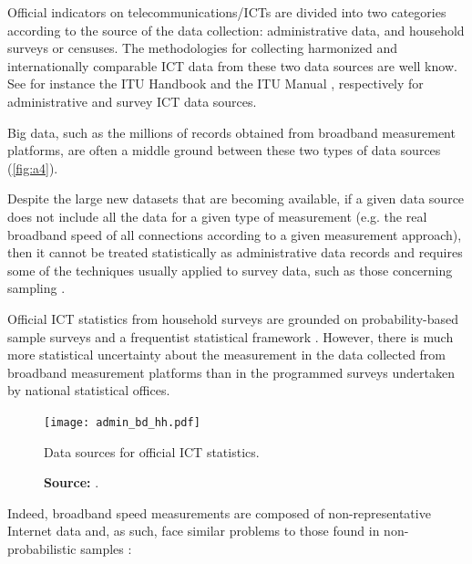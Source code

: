 \documentclass[12pt]{article}
\begin{document}
Official indicators on telecommunications/ICTs are divided into two categories according to the source of the data collection: administrative data, and household surveys or censuses. The methodologies for collecting harmonized and internationally comparable ICT data from these two data sources are well know. See for instance the ITU Handbook \citep{handbook} and the ITU Manual \citep{manual}, respectively for administrative and survey ICT data sources.   

Big data, such as the millions of records obtained from broadband measurement platforms, are often a middle ground between these two types of data sources (\autoref{fig:a4}). 

Despite the large new datasets that are becoming available, if a given data source does not include all the data for a given type of measurement (e.g. the real broadband speed of all connections according to a given measurement approach), then it cannot be treated statistically as administrative data records and requires some of the techniques usually applied to survey data, such as those concerning sampling \citep{bigdata}.

Official ICT statistics from household surveys are grounded on probability-based sample surveys and a frequentist statistical framework \citep{couper2013}. However, there is much more statistical uncertainty about the measurement in the data collected from broadband measurement platforms than in the programmed surveys undertaken by national statistical offices. 

\begin{figure}[H]
    \centering
        \texttt{[image: admin\_bd\_hh.pdf]}
        \caption{Data sources for official ICT statistics.}
        \caption*{\textbf{Source:} \cite{margus}.}
        \label{fig:a4}
\end{figure}   

Indeed, broadband speed measurements are composed of non-representative Internet data and, as such, face similar problems to those found in non-probabilistic samples \citep{couper2013,zagheni2015}:
\end{document}
